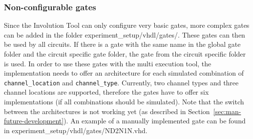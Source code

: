 \subsubsection{Non-configurable gates}\label{sec:man-gate-non-configurable-gates}

Since the Involution Tool can only configure very basic gates, more
complex gates can be added in the folder experiment\_setup/vhdl/gates/.
These gates can then be used by all circuits. If there is a gate with
the same name in the global gate folder and the circuit specific gate
folder, the gate from the circuit specific folder is used. In order to use 
these gates with the multi execution tool, the implementation needs to 
offer an architecture for each simulated combination of 
\lstinline|channel_location| and \lstinline|channel_type|. Currently, two 
channel types and three channel locations are supported, therefore the gates 
have to offer six implementations (if all combinations should be simulated). 
Note that the switch between the architectures is not working yet (as described 
in Section~\ref{sec:man-future-development}). An example of a manually 
implemented gate can be found in experiment\_setup/vhdl/gates/ND2N1N.vhd.
